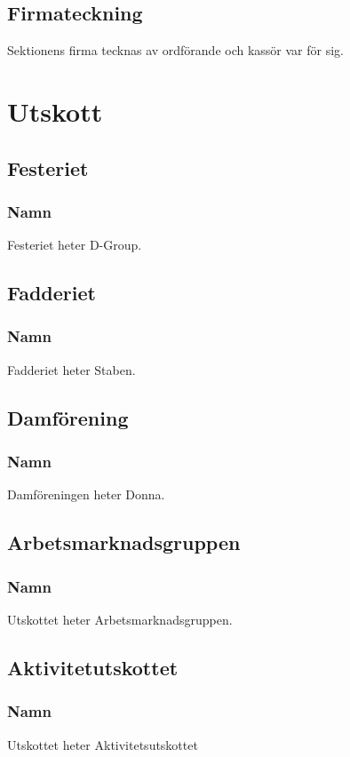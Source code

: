 \documentclass{datateknologsektionen-document}
\begin{document}
    \subsection{Firmateckning}
      Sektionens firma tecknas av ordförande och kassör var för sig.
  
  \section{Utskott}
    \subsection{Festeriet}
      \subsubsection{Namn}
        Festeriet heter D-Group.
    \subsection{Fadderiet}
      \subsubsection{Namn}
        Fadderiet heter Staben.
    \subsection{Damförening}
      \subsubsection{Namn}
        Damföreningen heter Donna.
    \subsection{Arbetsmarknadsgruppen}
      \subsubsection{Namn}
        Utskottet heter Arbetsmarknadsgruppen.
    \subsection{Aktivitetutskottet}
      \subsubsection{Namn}
        Utskottet heter Aktivitetsutskottet
\end{document}
